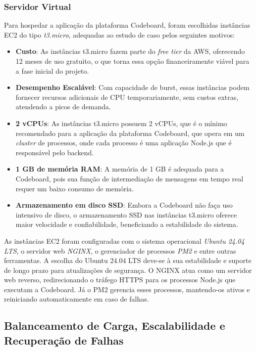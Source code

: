 \subsubsection{Servidor Virtual}

Para hospedar a aplicação da plataforma Codeboard, foram escolhidas instâncias EC2 do tipo \emph{t3.micro}, adequadas ao estudo de caso pelos seguintes motivos: 

\begin{itemize}
    \item \textbf{Custo}: As instâncias t3.micro fazem parte do \emph{free tier} da AWS, oferecendo 12 meses de uso gratuito, o que torna essa opção financeiramente viável para a fase inicial do projeto.
    \item \textbf{Desempenho Escalável}: Com capacidade de burst, essas instâncias podem fornecer recursos adicionais de CPU temporariamente, sem custos extras, atendendo a picos de demanda.
    \item \textbf{2 vCPUs}: As instâncias t3.micro possuem 2 vCPUs, que é o mínimo recomendado para a aplicação da plataforma Codeboard, que opera em um \emph{cluster} de processos, onde cada processo é uma aplicação Node.js que é responsável pelo backend.
    \item \textbf{1 GB de memória RAM}: A memória de 1 GB é adequada para a Codeboard, pois sua função de intermediação de mensagens em tempo real requer um baixo consumo de memória.
    \item \textbf{Armazenamento em disco SSD}: Embora a Codeboard não faça uso intensivo de disco, o armazenamento SSD nas instâncias t3.micro oferece maior velocidade e confiabilidade, beneficiando a estabilidade do sistema.
\end{itemize}

As instâncias EC2 foram configuradas com o sistema operacional \emph{Ubuntu 24.04 LTS}, o servidor web \emph{NGINX}, o gerenciador de processos \emph{PM2} e entre outras ferramentas. A escolha do Ubuntu 24.04 LTS deve-se à sua estabilidade e suporte de longo prazo para atualizações de segurança. O NGINX atua como um servidor web reverso, redirecionando o tráfego HTTPS para os processos Node.js que executam a Codeboard. Já o PM2 gerencia esses processos, mantendo-os ativos e reiniciando automaticamente em caso de falhas.

\subsection{Balanceamento de Carga, Escalabilidade e Recuperação de Falhas}

